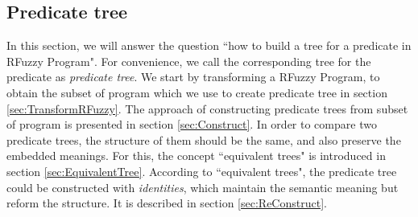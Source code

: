 \subsection{Predicate tree}
\label{sec:PredicateTree}
In this section, we will answer the question ``how to build a tree for a predicate in RFuzzy Program". For convenience, we call the corresponding tree for the predicate as \textit{predicate tree}. We start by transforming a RFuzzy Program, to obtain the subset of program which we use to create predicate tree in section \ref{sec:TransformRFuzzy}. The approach of constructing predicate trees from subset of program is presented in section \ref{sec:Construct}. In order to compare two predicate trees, the structure of them should be the same, and also preserve the embedded meanings. For this, the concept ``equivalent trees" is introduced in section \ref{sec:EquivalentTree}. According to ``equivalent trees", the predicate tree could be constructed with \textit{identities}, which maintain the semantic meaning but reform the structure. It is described in section \ref{sec:ReConstruct}.




